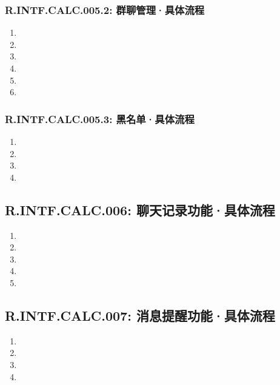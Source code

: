         \subsubsection{R.INTF.CALC.005.2: 群聊管理·具体流程}
        \begin{enumerate}
            \item 
            \item 
            \item 
            \item 
            \item 
            \item 
        \end{enumerate}
        \subsubsection{R.INTF.CALC.005.3: 黑名单·具体流程}
        \begin{enumerate}
            \item 
            \item 
            \item 
            \item 
        \end{enumerate}
    \subsection{R.INTF.CALC.006: 聊天记录功能·具体流程}
    \begin{enumerate}
        \item 
        \item 
        \item 
        \item 
        \item 
    \end{enumerate}
    \subsection{R.INTF.CALC.007: 消息提醒功能·具体流程}
    \begin{enumerate}
        \item 
        \item 
        \item 
        \item 
    \end{enumerate}
